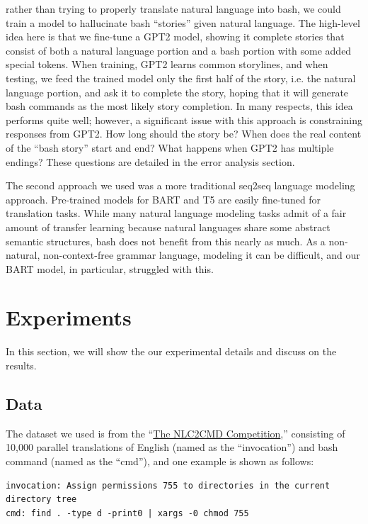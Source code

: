 \documentclass{article}
\begin{document}
rather than trying to properly translate natural language into bash, we could
train a model to hallucinate bash ``stories'' given natural language. The
high-level idea here is that we fine-tune a GPT2 model, showing it complete
stories that consist of both a natural language portion and a bash portion with
some added special tokens. When training, GPT2 learns common storylines,
and when testing, we feed the trained model only the first half of the
story, i.e. the natural language portion, and ask it to complete the story,
hoping that it will generate bash commands as the most likely story completion.
In many respects, this idea performs quite well; however, a significant issue
with this approach is constraining responses from GPT2. How long should the
story be? When does the real content of the ``bash story'' start and end? What
happens when GPT2 has multiple endings? These questions are detailed in the
error analysis section.
\par
The second approach we used was a more traditional seq2seq language modeling
approach. Pre-trained models for BART and T5 are easily fine-tuned for
translation tasks. While many natural language modeling tasks admit of a fair
amount of transfer learning because natural languages share some abstract
semantic structures, bash does not benefit from this nearly as much. As a
non-natural, non-context-free grammar language, modeling it can be difficult,
and our BART model, in particular, struggled with this.

\section{Experiments}
In this section, we will show the our experimental details and discuss on the results.

\subsection{Data}
The dataset we used is from the ``\href{https://nlc2cmd.us-east.mybluemix.net/}{The NLC2CMD Competition},'' consisting of 10,000 parallel translations of English (named as the ``invocation'') and bash command (named as the ``cmd''), and one example is shown as follows:

\begin{verbatim}
invocation: Assign permissions 755 to directories in the current directory tree
cmd: find . -type d -print0 | xargs -0 chmod 755
\end{verbatim}
\end{document}

